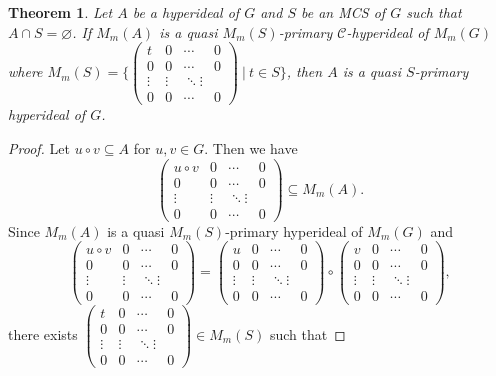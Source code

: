\documentclass[preprint,review,10pt]{amsart}
\newtheorem{theorem}{Theorem}[section]
\theoremstyle{definition}
\theoremstyle{remark}
\numberwithin{equation}{section}
\begin{document}
\begin{theorem}
Let $A$ be a   hyperideal of $G$ and $S$ be an MCS of $G$ such that $A \cap S=\varnothing$. If $M_m(A)$ is a quasi $M_m(S)$-primary  $\mathcal{C}$-hyperideal of $M_m(G)$ where $M_m(S)=\{\begin{pmatrix}
t & 0 & \cdots & 0 \\
0 & 0 & \cdots & 0 \\
\vdots & \vdots & \ddots \vdots \\
0 & 0 & \cdots & 0 
\end{pmatrix} \ \vert \ t \in S\}$, then $A$ is a quasi $S$-primary hyperideal of $G$. 
\end{theorem}
\begin{proof}
Let $u \circ v \subseteq A$ for $u,v \in G$. Then we have
\[\begin{pmatrix}
u \circ v & 0 & \cdots & 0 \\
0 & 0 & \cdots & 0 \\
\vdots & \vdots & \ddots \vdots \\
0 & 0 & \cdots & 0 
\end{pmatrix}
\subseteq M_m(A).\]
Since $M_m(A)$ is a quasi $M_m(S)$-primary   hyperideal of $M_m(G)$ and 
\[ \begin{pmatrix}
u \circ v & 0 & \cdots & 0\\
0 & 0 & \cdots & 0\\
\vdots & \vdots & \ddots \vdots\\
0 & 0 & \cdots & 0
\end{pmatrix}
=
\begin{pmatrix}
u & 0 & \cdots & 0\\
0 & 0 & \cdots & 0\\
\vdots & \vdots & \ddots \vdots\\
0 & 0 & \cdots & 0
\end{pmatrix}
\circ  
\begin{pmatrix}
v & 0 & \cdots & 0\\
0 & 0 & \cdots & 0\\
\vdots & \vdots & \ddots \vdots\\
0 & 0 & \cdots & 0
\end{pmatrix},
\]
there exists $\begin{pmatrix}
t & 0 & \cdots & 0 \\
0 & 0 & \cdots & 0 \\
\vdots & \vdots & \ddots \vdots \\
0 & 0 & \cdots & 0 
\end{pmatrix} \in M_m(S)$ such that  

\end{proof}
\end{document}
